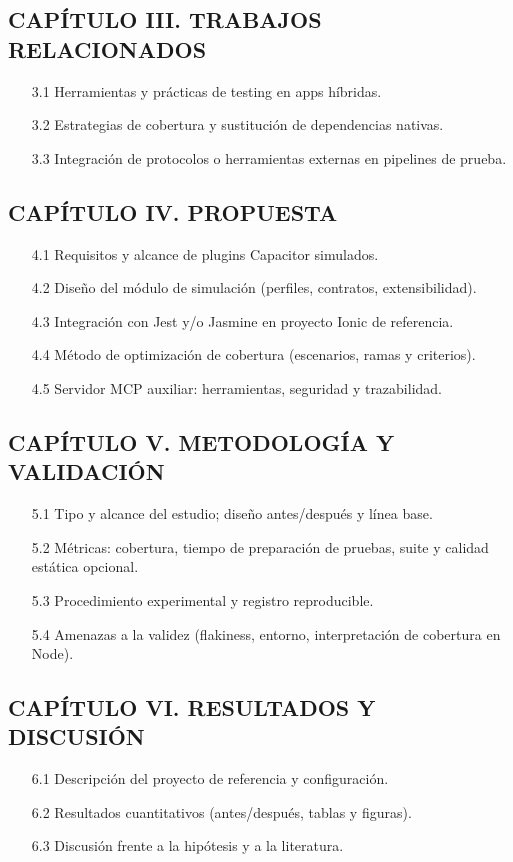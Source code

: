 \subsection*{CAPÍTULO III. TRABAJOS RELACIONADOS}
\begin{enumerate}
    \item[3.1] Herramientas y prácticas de testing en apps híbridas.
    \item[3.2] Estrategias de cobertura y sustitución de dependencias nativas.
    \item[3.3] Integración de protocolos o herramientas externas en pipelines de prueba.
\end{enumerate}

\subsection*{CAPÍTULO IV. PROPUESTA}
\begin{enumerate}
    \item[4.1] Requisitos y alcance de plugins Capacitor simulados.
    \item[4.2] Diseño del módulo de simulación (perfiles, contratos, extensibilidad).
    \item[4.3] Integración con Jest y/o Jasmine en proyecto Ionic de referencia.
    \item[4.4] Método de optimización de cobertura (escenarios, ramas y criterios).
    \item[4.5] Servidor MCP auxiliar: herramientas, seguridad y trazabilidad.
\end{enumerate}

\subsection*{CAPÍTULO V. METODOLOGÍA Y VALIDACIÓN}
\begin{enumerate}
    \item[5.1] Tipo y alcance del estudio; diseño antes/después y línea base.
    \item[5.2] Métricas: cobertura, tiempo de preparación de pruebas, suite y calidad estática opcional.
    \item[5.3] Procedimiento experimental y registro reproducible.
    \item[5.4] Amenazas a la validez (flakiness, entorno, interpretación de cobertura en Node).
\end{enumerate}

\subsection*{CAPÍTULO VI. RESULTADOS Y DISCUSIÓN}
\begin{enumerate}
    \item[6.1] Descripción del proyecto de referencia y configuración.
    \item[6.2] Resultados cuantitativos (antes/después, tablas y figuras).
    \item[6.3] Discusión frente a la hipótesis y a la literatura.
\end{enumerate}

